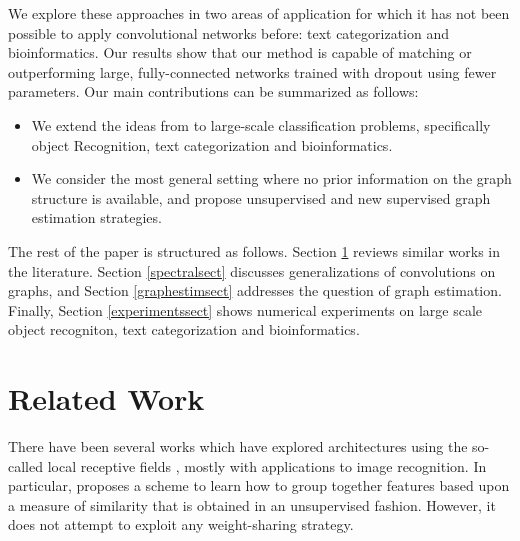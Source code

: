 \documentclass{article} %
\begin{document}
We explore these approaches in two areas of application for which it has not been possible to apply convolutional networks before: text categorization and bioinformatics. Our results show that our method is capable of matching or outperforming large, fully-connected networks trained with dropout using fewer parameters. 
Our main contributions can be summarized as follows:
\begin{itemize}
\item We extend the ideas from \cite{spectralnet2013} to large-scale classification problems, specifically object Recognition, text categorization and bioinformatics.
\item We consider the most general setting where no prior information on the graph structure is available, and propose unsupervised and new supervised graph estimation strategies.
\end{itemize}

The rest of the paper is structured as follows. Section \ref{relatedworksect} reviews similar works in the literature. Section \ref{spectralsect} discusses generalizations of convolutions on graphs, and Section \ref{graphestimsect} addresses the question of graph estimation. Finally, Section \ref{experimentssect} shows numerical experiments on large scale object recogniton, text categorization and bioinformatics.

\section{Related Work}
\label{relatedworksect}

There have been several works which have explored architectures using the so-called local receptive fields \cite{karol, coates2011selecting, ngiam2010tiled}, mostly with applications to image recognition. In particular, \cite{coates2011selecting} proposes a scheme to learn how to group together features based upon a measure of similarity that is obtained in an unsupervised fashion. However, it does not attempt to exploit any weight-sharing strategy. 
\end{document}
